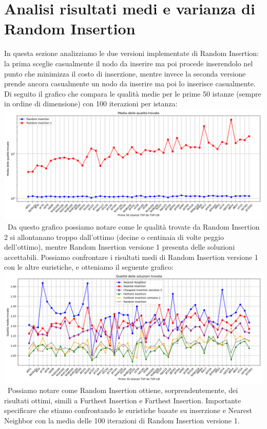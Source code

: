 \documentclass[a4paper,12pt]{report}
\begin{document}
\section{Analisi risultati medi e varianza di Random Insertion}
In questa sezione analizziamo le due versioni implementate di Random Insertion: la prima sceglie casualmente il nodo da inserire ma poi procede inserendolo nel punto che minimizza il costo di inserzione, mentre invece la seconda versione prende ancora casualmente un nodo da inserire ma poi lo inserisce casualmente. Di seguito il grafico che compara le qualità medie per le prime 50 istanze (sempre in ordine di dimensione) con 100 iterazioni per istanza: \newline
\includegraphics[width=1\textwidth]{../Grafici/13.png} \
Da questo grafico possiamo notare come le qualità trovate da Random Insertion 2 si allontanano troppo dall'ottimo (decine o centinaia di volte peggio dell'ottimo), mentre Random Insertion versione 1 presenta delle soluzioni accettabili. Possiamo confrontare i risultati medi di Random Insertion versione 1 con le altre euristiche, e otteniamo il seguente grafico: \newline
\includegraphics[width=1\textwidth]{../Grafici/14.png} \
Possiamo notare come Random Insertion ottiene, sorprendentemente, dei risultati ottimi, simili a Furthest Insertion e Farthest Insertion. Importante specificare che stiamo confrontando le euristiche basate su inserzione e Nearest Neighbor con la media delle 100 iterazioni di Random Insertion versione 1. \newline
\end{document}

